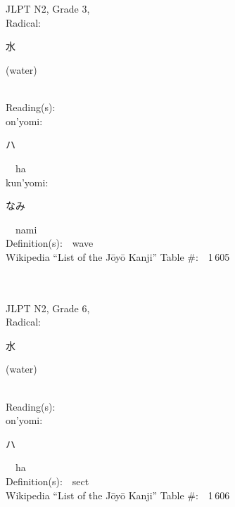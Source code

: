 \begin{multicols}{2}
\ \ \\
{\fontsize{34pt}{40pt}  }\ \ \\  %
{JLPT N2, Grade 3, \\Radical:\ \ {\begin{CJK}{UTF8}{min} 水 \end{CJK}} (water) } \\
Reading(s):\ \ \\
{\hspace*{1em}}on'yomi:\ \ \\
{\hspace*{2em}}{\begin{CJK}{UTF8}{min} ハ \end{CJK}}\ \ ha\ \ \\
{\hspace*{1em}}kun'yomi:\ \ \\
{\hspace*{2em}}{\begin{CJK}{UTF8}{min} なみ \end{CJK}}\ \ nami\ \ \\
Definition(s):\ \ wave \\
Wikipedia ``List of the J\=oy\=o Kanji'' Table \#:\ \ 1\,605 \\
\ \ \\
{\fontsize{34pt}{40pt}  }\ \ \\  %
{JLPT N2, Grade 6, \\Radical:\ \ {\begin{CJK}{UTF8}{min} 水 \end{CJK}} (water) } \\
Reading(s):\ \ \\
{\hspace*{1em}}on'yomi:\ \ \\
{\hspace*{2em}}{\begin{CJK}{UTF8}{min} ハ \end{CJK}}\ \ ha\ \ \\
Definition(s):\ \ sect \\
Wikipedia ``List of the J\=oy\=o Kanji'' Table \#:\ \ 1\,606 \\
\ \ \\

\end{multicols}
